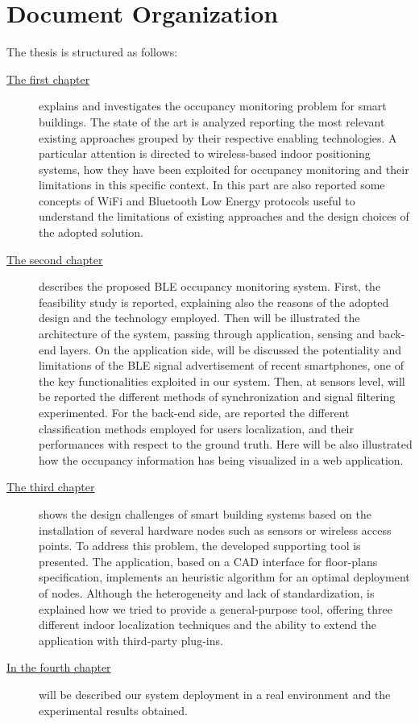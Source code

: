 \section{Document Organization}
%
\par The thesis is structured as follows:
%
%
\begin{description}
%
\item[{\hyperref[cap:soa]{The first chapter}}] explains and investigates the occupancy monitoring problem for smart buildings. The state of the art is analyzed reporting the most relevant existing approaches grouped by their respective enabling technologies. A particular attention is directed to wireless-based indoor positioning systems, how they have been exploited for occupancy monitoring and their limitations in this specific context. In this part are also reported some concepts of WiFi and Bluetooth Low Energy protocols useful to understand the limitations of existing approaches and the design choices of the adopted solution.
%
\item[{\hyperref[cap:bluesentinel]{The second chapter}}] describes the proposed BLE occupancy monitoring system. First, the feasibility study is reported, explaining also the reasons of the adopted design and the technology employed. Then will be illustrated the architecture of the system, passing through application, sensing and back-end layers. On the application side, will be discussed the potentiality and limitations of the BLE signal advertisement of recent smartphones, one of the key functionalities exploited in our system. Then, at sensors level, will be reported the different methods of synchronization and signal filtering experimented. For the back-end side, are reported the different classification methods employed for users localization, and their performances with respect to the ground truth. Here will be also illustrated how the occupancy information has being visualized in a web application.
%
\item[{\hyperref[cap:cad]{The third chapter}}] shows the design challenges of smart building systems based on the installation of several hardware nodes such as sensors or wireless access points. To address this problem, the developed supporting tool is presented. The application, based on a CAD interface for floor-plans specification, implements an heuristic algorithm for an optimal deployment of nodes. Although the heterogeneity and lack of standardization, is explained how we tried to provide a general-purpose tool, offering three different indoor localization techniques and the ability to extend the application with third-party plug-ins.
%
\item[{\hyperref[cap:results]{In the fourth chapter}}] will be described our system deployment in a real environment and the experimental results obtained. \lipsum[2]
%
\end{description}
%
